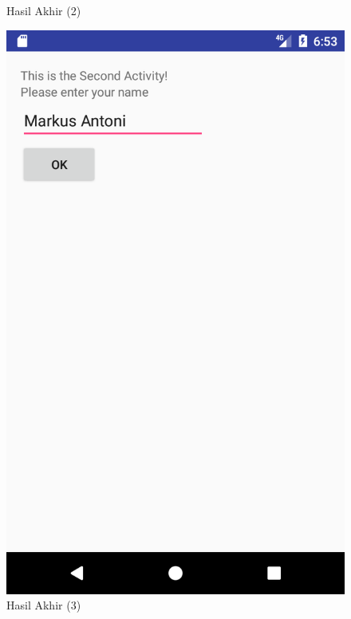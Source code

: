 \documentclass{scrartcl}
\begin{document}
\begin{enumerate}
\begin{figure}[htbp]
\begin{minipage}{.5\textwidth}
		\caption{Hasil Akhir (2)}
		\label{fig:screenshot_1496836388}
	\end{minipage}
	\end{figure}

	\begin{figure}[htbp]
		\begin{minipage}{.5\textwidth}
		\centering
		\includegraphics[width=0.7\linewidth]{Screenshot_1496836393}
		\caption{Hasil Akhir (3)}
		\label{fig:screenshot_1496836393}
	\end{minipage}
	\begin{minipage}{.5\textwidth}
		\centering

\end{minipage}
\end{figure}
\end{enumerate}
\end{document}
